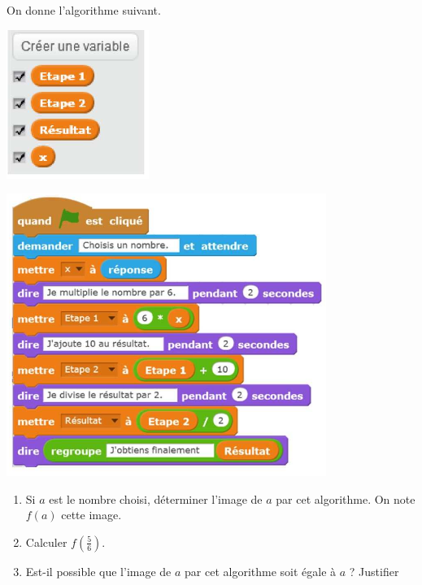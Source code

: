 
On donne l'algorithme suivant.
\parbox{0.28\linewidth}{
\includegraphics[scale=1]{NF-42.png} 
}
\parbox{0.48\linewidth}{
\includegraphics[scale=1]{NF-43.png}
}
\medskip

\begin{enumerate}
\item Si $a$ est le nombre choisi, déterminer l'image de $a$ par cet algorithme. On note $f(a)$ cette image.
\item Calculer $f\left(\frac{5}{6}\right)$.
\item Est-il possible que l'image de $a$ par cet algorithme soit égale à $a$ ? Justifier
\end{enumerate}
